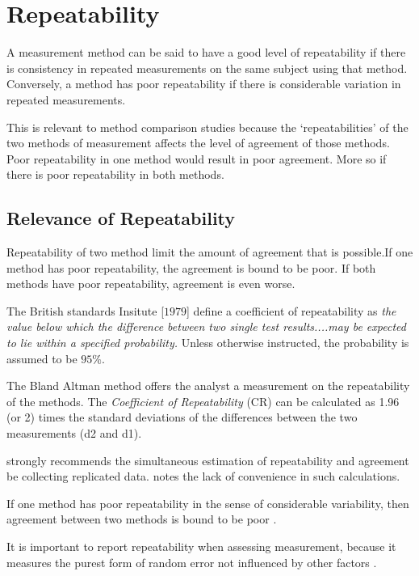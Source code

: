 \section{Repeatability}
A measurement method can be said to have a good level of repeatability if there is consistency in repeated measurements on the same subject using that method. Conversely, a method has poor repeatability if there is considerable variation in repeated measurements.

This is relevant to method comparison studies because the `repeatabilities' of the two methods of measurement affects the level of agreement of those methods. Poor repeatability in one method would result in poor agreement. More so if there is poor repeatability in both methods.

\subsection{Relevance of Repeatability} Repeatability of two method limit the amount of agreement that is possible.If one method has poor repeatability, the agreement is bound to be poor. If both methods have poor repeatability, agreement is even worse.

The British standards Insitute [$1979$] define a coefficient of
repeatability  as \emph{the value below which the difference
between two single test results....may be expected to lie within a
specified probability.} Unless otherwise instructed, the
probability is assumed to be $95\%$.

The Bland Altman method offers the analyst a measurement on the repeatability of the methods. The \emph{Coefficient of Repeatability} (CR) can be calculated as 1.96 (or 2) times the standard deviations of the differences between the two measurements (d2 and d1).


\citet{BA99} strongly recommends the simultaneous estimation of repeatability and agreement be collecting replicated data. \citet{ARoy2009} notes the lack of convenience in such calculations.


If one method has poor repeatability in the sense of considerable variability, then agreement between two methods is bound to be poor \citep{ARoy2009}.

It is important to report repeatability when assessing measurement, because it measures the purest form of random error not influenced by other factors \citep{Barnhart}.
